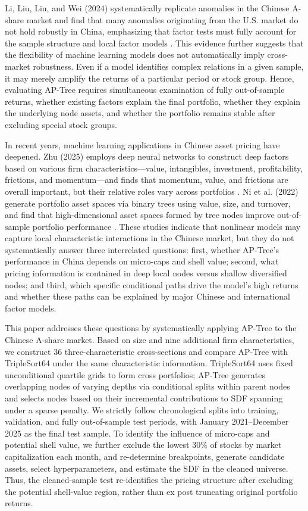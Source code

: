 \documentclass[12pt]{article}
\begin{document}
Li, Liu, Liu, and Wei (2024) systematically replicate anomalies in the Chinese A-share market and find that many anomalies originating from the U.S. market do not hold robustly in China, emphasizing that factor tests must fully account for the sample structure and local factor models \cite{ref16}. This evidence further suggests that the flexibility of machine learning models does not automatically imply cross-market robustness. Even if a model identifies complex relations in a given sample, it may merely amplify the returns of a particular period or stock group. Hence, evaluating AP-Tree requires simultaneous examination of fully out-of-sample returns, whether existing factors explain the final portfolio, whether they explain the underlying node assets, and whether the portfolio remains stable after excluding special stock groups.

In recent years, machine learning applications in Chinese asset pricing have deepened. Zhu (2025) employs deep neural networks to construct deep factors based on various firm characteristics—value, intangibles, investment, profitability, frictions, and momentum—and finds that momentum, value, and frictions are overall important, but their relative roles vary across portfolios \cite{ref22}. Ni et al. (2022) generate portfolio asset spaces via binary trees using value, size, and turnover, and find that high-dimensional asset spaces formed by tree nodes improve out-of-sample portfolio performance \cite{ref19}. These studies indicate that nonlinear models may capture local characteristic interactions in the Chinese market, but they do not systematically answer three interrelated questions: first, whether AP-Tree's performance in China depends on micro-caps and shell value; second, what pricing information is contained in deep local nodes versus shallow diversified nodes; and third, which specific conditional paths drive the model's high returns and whether these paths can be explained by major Chinese and international factor models.

This paper addresses these questions by systematically applying AP-Tree to the Chinese A-share market. Based on size and nine additional firm characteristics, we construct 36 three-characteristic cross-sections and compare AP-Tree with TripleSort64 under the same characteristic information. TripleSort64 uses fixed unconditional quartile grids to form cross portfolios; AP-Tree generates overlapping nodes of varying depths via conditional splits within parent nodes and selects nodes based on their incremental contributions to SDF spanning under a sparse penalty. We strictly follow chronological splits into training, validation, and fully out-of-sample test periods, with January 2021–December 2025 as the final test sample. To identify the influence of micro-caps and potential shell value, we further exclude the lowest $30\%$ of stocks by market capitalization each month, and re-determine breakpoints, generate candidate assets, select hyperparameters, and estimate the SDF in the cleaned universe. Thus, the cleaned-sample test re-identifies the pricing structure after excluding the potential shell-value region, rather than ex post truncating original portfolio returns.
\end{document}
